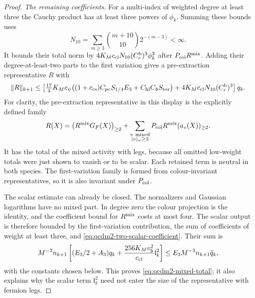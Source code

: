 \documentclass[11pt,letterpaper,reqno]{amsart}
\theoremstyle{definition}
\theoremstyle{remark}
\begin{document}
\begin{proof}
\emph{The remaining coefficients.}
For a multi-index of weighted degree at least three the
Cauchy product has at least three powers of $\phi_k$.
Summing these bounds uses
\[
 N_{10}=\sum_{m\ge3}\binom{m+10}{10}2^{-(m-3)}<\infty.
\]
It bounds their total norm by
$4K_Mc_{\rm cl}N_{10}(C_r^{\rm b})^3\phi_k^3$ after
$P_{\rm col}R^{\rm mix}$.
Adding their degree-at-least-two parts to the first
variation gives a pre-extraction representative $R$ with
\[
 \|R\|_{k+1}\le
 \left[\tfrac{17}{4}K_Mc_\psi
       \bigl((1+c_{\rm cs})C_{\rm pc}S_{1/4}E_3
                    +C_{\rm hl}C_{\mathfrak d}S_{\rm tor}\bigr)
       +4K_Mc_{\rm cl}N_{10}(C_r^{\rm b})^3\right]q_k.
\]
For clarity, the pre-extraction representative in this
display is the explicitly defined family
\[
 R(X)=\bigl(R^{\rm mix}G_F(X)\bigr)_{\ge2}
   +\sum_{\substack{v\ \text{mixed}\\|v|_w\ge3}}
          P_{\rm col}R^{\rm mix}(a_v(X))_{\ge2}.
\]
It has the total of the mixed activity with legs,
because all omitted low-weight totals were just shown
to vanish or to be scalar.  Each retained term is
neutral in both species.  The first-variation family
is formed from colour-invariant representatives, so
it is also invariant under $P_{\rm col}$.

The scalar estimate can already be closed.  The
normalizers and Gaussian logarithms have no mixed
part.  In degree zero the colour projection is the
identity, and the coefficient bound for $R^{\rm mix}$
costs at most four.  The scalar output is therefore
bounded by the first-variation contribution, the
sum of coefficients of weight at least three, and
\eqref{eq:qcdm2-two-scalar-coefficient}.  Their sum is
\[
 M^{-3}n_{k+1}\left[
       (E_3/2+A_3)q_k
       +\frac{256K_Mv_{\mathsf S}^2}{c_{\rm cl}}\mathfrak l_k^2
                       \right]
       \le E_3M^{-3}n_{k+1}\bar q_k,
\]
with the constants chosen below.  This proves
\eqref{eq:qcdm2-mixed-total}; it also explains why the
scalar term $\mathfrak l_k^2$ need not enter the size
of the representative with fermion legs.


\end{proof}
\end{document}
